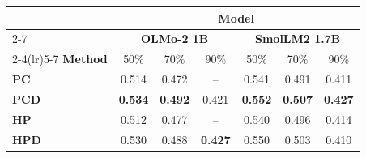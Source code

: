 \begin{table}[t!]
\centering
\small
\setlength{\tabcolsep}{3pt}
\begin{tabular}{lccc|ccc}
\toprule
& \multicolumn{6}{c}{\textbf{Model}} \\
\cmidrule(lr){2-7}
& \multicolumn{3}{c|}{\textbf{OLMo-2 1B}} & \multicolumn{3}{c}{\textbf{SmolLM2 1.7B}} \\
\cmidrule(lr){2-4}\cmidrule(lr){5-7}
\textbf{Method} & 50\% & 70\% & 90\% & 50\% & 70\% & 90\% \\
\midrule
\textbf{PC} & 0.514 & 0.472 & -- & 0.541 & 0.491 & 0.411 \\
\textbf{PCD} & \textbf{0.534} & \textbf{0.492} & 0.421 & \textbf{0.552} & \textbf{0.507} & \textbf{0.427} \\
\textbf{HP} & 0.512 & 0.477 & -- & 0.540 & 0.496 & 0.414 \\
\textbf{HPD} & 0.530 & 0.488 & \textbf{0.427} & 0.550 & 0.503 & 0.410 \\
\bottomrule
\end{tabular}
\end{table}
